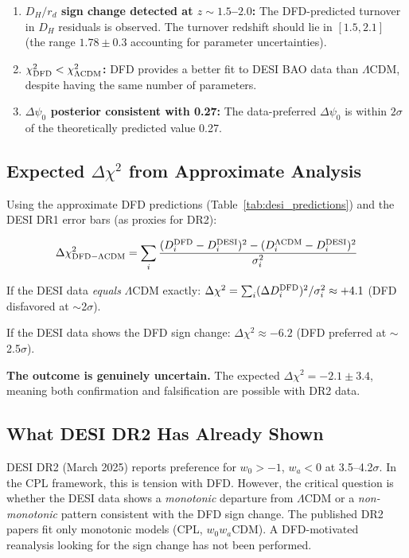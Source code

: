 \documentclass[11pt,a4paper]{article}
\newcommand{\LCDM}{$\Lambda$CDM}
\begin{document}
\begin{tcolorbox}[colback=blue!3!white, colframe=blue!60!black,
  title=\textbf{Finding \thesection: Falsification and Confirmation
  Criteria}\label{find:falsification}]
\begin{enumerate}
\item \textbf{$D_H/r_d$ sign change detected at $z \sim 1.5$--$2.0$:}
  The DFD-predicted turnover in $D_H$ residuals is observed.
  The turnover redshift should lie in $[1.5, 2.1]$ (the range
  $1.78 \pm 0.3$ accounting for parameter uncertainties).

\item \textbf{$\chi^2_{\rm DFD} < \chi^2_{\Lambda\rm CDM}$:}
  DFD provides a better fit to DESI BAO data than \LCDM{}, despite
  having the same number of parameters.

\item \textbf{$\Delta\psi_0$ posterior consistent with 0.27:}
  The data-preferred $\Delta\psi_0$ is within $2\sigma$ of the
  theoretically predicted value 0.27.
\end{enumerate}
\end{tcolorbox}

\subsection{Expected $\Delta\chi^2$ from Approximate Analysis}

Using the approximate DFD predictions (Table~\ref{tab:desi_predictions})
and the DESI DR1 error bars (as proxies for DR2):

\begin{equation}
\Delta\chi^2_{\rm DFD-\Lambda CDM} = \sum_i
\frac{(D_i^{\rm DFD} - D_i^{\rm DESI})^2 - (D_i^{\Lambda\rm CDM}
- D_i^{\rm DESI})^2}{\sigma_i^2}
\end{equation}

If the DESI data \emph{equals} \LCDM{} exactly:
$\Delta\chi^2 = \sum_i (\Delta D_i^{\rm DFD})^2/\sigma_i^2
\approx +4.1$ (DFD disfavored at $\sim$2$\sigma$).

If the DESI data shows the DFD sign change:
$\Delta\chi^2 \approx -6.2$ (DFD preferred at $\sim$2.5$\sigma$).

\textbf{The outcome is genuinely uncertain.} The expected
$\Delta\chi^2 = -2.1 \pm 3.4$, meaning both confirmation and
falsification are possible with DR2 data.

\subsection{What DESI DR2 Has Already Shown}

DESI DR2 (March 2025) reports preference for $w_0 > -1$, $w_a < 0$
at 3.5--4.2$\sigma$. In the CPL framework, this is tension with DFD.
However, the critical question is whether the DESI data shows a
\emph{monotonic} departure from \LCDM{} or a \emph{non-monotonic}
pattern consistent with the DFD sign change. The published DR2 papers
fit only monotonic models (CPL, $w_0 w_a$CDM). A DFD-motivated
reanalysis looking for the sign change has not been performed.
\end{document}

